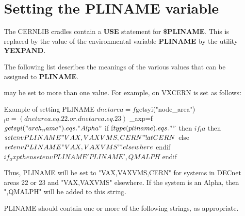 \chapter{Setting the PLINAME variable}
\label{sect-PLINAME}

The CERNLIB cradles contain a {\bf USE} statement for {\bf \$PLINAME}.
This is replaced by the value of the environmental variable {\bf PLINAME}
by the utility {\bf YEXPAND}.

The following list describes the meanings of the various values that
can be assigned to {\bf PLINAME}.

\PLINAME{} may be set to more than one value. For example, on VXCERN
\PLINAME{} is set as follows:

\begin{XMPt}{Example of setting PLINAME}
$ dnetarea=f$getsyi("node_area")
$ _la=(dnetarea.eq.22.or.dnetarea.eq.23)
$ _axp=f$getsyi("arch_name").eqs."Alpha"
$ if f$type(pliname) .eqs. ""
$ then
$   if _la
$     then
$       setenv PLINAME "VAX,VAXVMS,CERN"      ! at CERN
$     else
$       setenv PLINAME "VAX,VAXVMS"           ! elsewhere
$     endif
$   if _axp then setenv PLINAME 'PLINAME',QMALPH
$ endif
\end{XMPt}

Thus, PLINAME will be set to "VAX,VAXVMS,CERN" for systems
in DECnet areas 22 or 23 and "VAX,VAXVMS" elsewhere. If
the system is an Alpha, then ",QMALPH" will be added to this string.


PLINAME should contain one or more of the following strings, as 
appropriate. 

